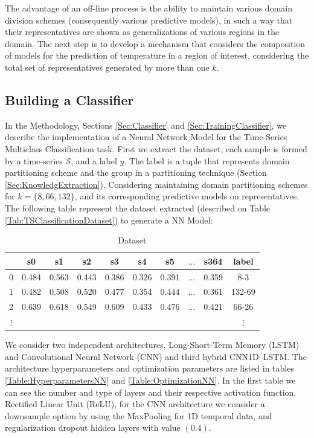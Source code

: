 The advantage of an off-line process is the ability to maintain various domain division schemes (consequently various predictive models), in such a way that their representatives are shown as generalizations of various regions in the domain. The next step is to develop a mechanism that considers the composition of models for the prediction of temperature in a region of interest, considering the total set of representatives generated by more than one $k$. 

\subsection{Building a Classifier}
\label{Sec:ExperimentsTrainingClassifier}

In the Methodology, Sections \ref{Sec:Classifier} and \ref{Sec:TrainingClassifier}, we describe the implementation of a Neural Network Model for the Time-Series Multiclass Classification task. First we extract the dataset, each sample is formed by a time-series $\mathcal{S}$, and a label $y$. The label is a tuple that represents domain partitioning scheme and the group in a partitioning technique (Section \ref{Sec:KnowledgExtraction}). Considering maintaining domain partitioning schemes for $k = \{8, 66, 132\}$, and its corresponding predictive models on representatives. The following table represent the dataset extracted (described on Table \ref{Tab:TSClassificationDataset}) to generate a NN Model:

\begin{table}[h]
	\centering
	\small
	\begin{tabular}[h]{|c|c|c|c|c|c|c|c|c|c|}
		\hline
		  & s0    & s1    & s2    & s3    & s4    &	s5    & $\ldots$ & s364  &   label \\ \hline
		0 & 0.484 & 0.563 & 0.443 & 0.386 & 0.326 &	0.391 & $\ldots$ & 0.359 &   8-3 \\
		1 &	0.482 &	0.508 &	0.520 &	0.477 &	0.354 &	0.444 & $\ldots$ & 0.361 & 132-69 \\
		2 &	0.639 & 0.618 &	0.549 &	0.609 &	0.433 & 0.476 & $\ldots$ & 0.421 &	66-26 \\ 
		$\vdots$  & &     &       &       &       &       &          &       & $\vdots$ \\ \hline
	\end{tabular}
	\caption{Dataset }
	\label{Table:DatasetTSC}
\end{table}

We consider two independent architectures, Long-Short-Term Memory (LSTM) and Convolutional Neural Network (CNN) and third hybrid CNN1D--LSTM. The architecture hyperparameters and optimization parameters are listed in tables \ref{Table:HyperparametersNN} and \ref{Table:OptimizationNN}. In the first table we can see the number and type of layers and their respective activation function, Rectified Linear Unit (ReLU), for the CNN architecture we consider a downsample option by using the MaxPooling for 1D temporal data, and regularization dropout hidden layers with value $(0.4)$.

